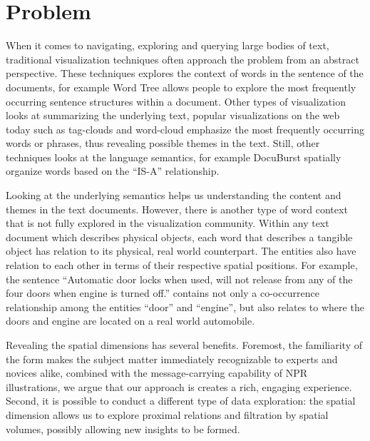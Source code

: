 \section{Problem}
When it comes to navigating, exploring and querying large bodies of text,
traditional visualization techniques often approach the problem from an abstract
perspective. These techniques explores the context of words in the sentence of
the documents, for example Word Tree \cite{Wattenberg2008} allows people to
explore the most frequently occurring sentence structures within a document.
Other types of visualization looks at summarizing the underlying text, popular 
visualizations on the web today such as tag-clouds and word-cloud emphasize
the most frequently occurring words or phrases, thus revealing possible themes in
the text. Still, other techniques looks at the language semantics, for example 
DocuBurst \cite{COL2009a} spatially organize words based on the ``IS-A'' relationship.

Looking at the underlying semantics helps us understanding the content and 
themes in the text documents. However, there is another type of word context 
that is not fully explored in the visualization community. Within any text 
document which describes physical objects, each word that describes a 
tangible object has relation to its physical, real world counterpart. The 
entities also have relation to each other in terms of their respective 
spatial positions. For example, the sentence ``Automatic door locks when 
used, will not release from any of the four doors when engine is turned off.'' 
contains not only a co-occurrence relationship among the entities ``door'' and 
``engine'', but also relates to where the doors and engine are located on a 
real world automobile.


Revealing the spatial dimensions has several benefits. Foremost, the
familiarity of the form makes the subject matter immediately recognizable
to experts and novices alike, combined with the message-carrying
capability of NPR illustrations, we argue that our approach is creates a
rich, engaging experience. Second, it is possible to conduct a different
type of data exploration: the spatial dimension allows us to explore
proximal relations and filtration by spatial volumes, possibly allowing
new insights to be formed.

